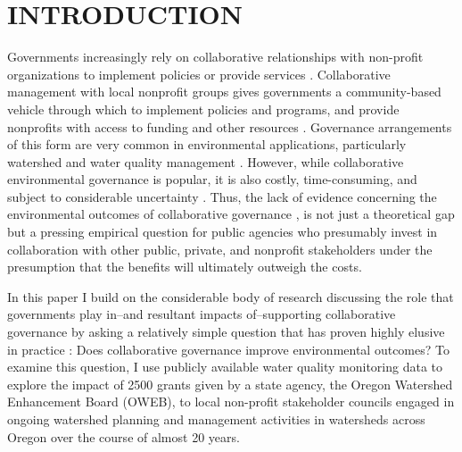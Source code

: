 \documentclass[12pt,a4paper,titlepage]{article}
\begin{document}
\doublespacing

\section*{\bf\MakeUppercase{Introduction}}

Governments increasingly rely on collaborative relationships with non-profit organizations to implement policies or provide services \parencite{salamon2002}. Collaborative management with local nonprofit groups gives governments a community-based vehicle through which to implement policies and programs, and provide nonprofits with access to funding and other resources \parencite{nikolic2008}. Governance arrangements of this form are very common in environmental applications, particularly watershed and water quality management \parencite[e.g.,][]{leach2013,leach2002,margerum2011,hardy2008}. However, while collaborative environmental governance is popular, it is also costly, time-consuming, and subject to considerable uncertainty \parencite{margerum2011}. Thus, the lack of evidence concerning the environmental outcomes of collaborative governance \parencite{thomas2012}, is not just a theoretical gap but a pressing empirical question for public agencies who presumably invest in collaboration with other public, private, and nonprofit stakeholders under the presumption that the benefits will ultimately outweigh the costs. 

In this paper I build on the considerable body of research discussing the role that governments play in--and resultant impacts of--supporting collaborative governance \parencite[e.g.,][]{nikolic2008,lubell2008,ansell2008,emerson2012} by asking a relatively simple question that has proven highly elusive in practice \parencite{koontz2006,carr2012}: Does collaborative governance improve environmental outcomes? To examine this question, I use publicly available water quality monitoring data to explore the impact of 2500 grants given by a state agency, the Oregon Watershed Enhancement Board (OWEB), to local non-profit stakeholder councils engaged in ongoing watershed planning and management activities in watersheds across Oregon over the course of almost 20 years.
\end{document}
